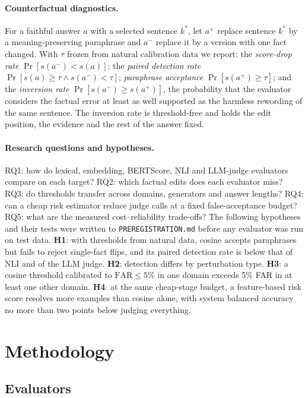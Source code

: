\paragraph{Counterfactual diagnostics.}
For a faithful answer $a$ with a selected sentence $k^\ast$, let $a^{+}$ replace sentence $k^\ast$ by a meaning-preserving paraphrase and $a^{-}$ replace it by a version with one fact changed. With $\tau$ frozen from natural calibration data we report: the \emph{score-drop rate} $\Pr[s(a^{-})<s(a)]$; the \emph{paired detection rate} $\Pr[s(a)\ge\tau\wedge s(a^{-})<\tau]$; \emph{paraphrase acceptance} $\Pr[s(a^{+})\ge\tau]$; and the \emph{inversion rate} $\Pr[s(a^{-})\ge s(a^{+})]$, the probability that the evaluator considers the factual error at least as well supported as the harmless rewording of the same sentence. The inversion rate is threshold-free and holds the edit position, the evidence and the rest of the answer fixed.

\paragraph{Research questions and hypotheses.}
RQ1: how do lexical, embedding, BERTScore, NLI and LLM-judge evaluators compare on each target? RQ2: which factual edits does each evaluator miss? RQ3: do thresholds transfer across domains, generators and answer lengths? RQ4: can a cheap risk estimator reduce judge calls at a fixed false-acceptance budget? RQ5: what are the measured cost--reliability trade-offs? The following hypotheses and their tests were written to \texttt{PREREGISTRATION.md} before any evaluator was run on test data.
\textbf{H1}: with thresholds from natural data, cosine accepts paraphrases but fails to reject single-fact flips, and its paired detection rate is below that of NLI and of the LLM judge.
\textbf{H2}: detection differs by perturbation type.
\textbf{H3}: a cosine threshold calibrated to $\mathrm{FAR}\le 5\%$ in one domain exceeds 5\% FAR in at least one other domain.
\textbf{H4}: at the same cheap-stage budget, a feature-based risk score resolves more examples than cosine alone, with system balanced accuracy no more than two points below judging everything.

\section{Methodology}
\label{sec:method}

\subsection{Evaluators}
\label{sec:evaluators}

